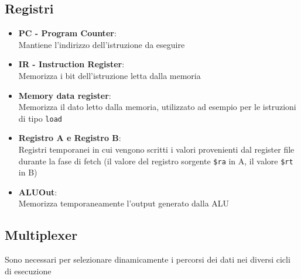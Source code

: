 \subsection{Registri}
\begin{itemize}
    \item \textbf{PC - Program Counter}: \\
        Mantiene l'indirizzo dell'istruzione da eseguire

    \item \textbf{IR - Instruction Register}: \\
        Memorizza i bit dell'istruzione letta dalla memoria

    \item \textbf{Memory data register}: \\
        Memorizza il dato letto dalla memoria, utilizzato ad esempio per le istruzioni di tipo \texttt{load}

    \item \textbf{Registro A e Registro B}: \\
        Registri temporanei in cui vengono scritti i valori provenienti dal register file durante la fase di fetch (il valore del registro sorgente \texttt{\$ra} in A, il valore \texttt{\$rt} in B)

    \item \textbf{ALUOut}: \\
        Memorizza temporaneamente l'output generato dalla ALU
\end{itemize}

\subsection{Multiplexer}
Sono necessari per selezionare dinamicamente i percorsi dei dati nei diversi cicli di esecuzione

